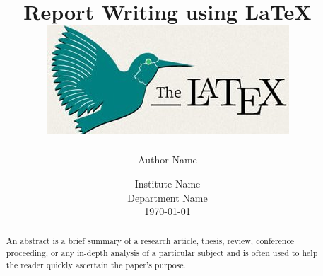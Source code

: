 \documentclass[12pt,a4paper,twoside,openright]{report}
\title{Report Writing using \LaTeX\\[1.5cm] \includegraphics[scale=0.6]{latex}}
\author{Author Name}
\date{Institute Name\\ Department Name\\[5mm] \today}
\begin{document}
\pagestyle{empty}	

\maketitle	
\cleardoublepage

\onehalfspacing
{}
\pagestyle{plain}

\begin{abstract}
An abstract is a brief summary of a research article, thesis, review, conference proceeding, or any in-depth analysis of a particular subject and is often used to help the reader quickly ascertain the paper's purpose.
\end{abstract}	

\cleardoublepage
\pagestyle{fancy}

\tableofcontents
\listoffigures
\listoftables	

\cleardoublepage
\doublespacing
{}	


	
	

\appendix	
	

\singlespacing

	

	
\end{document}
